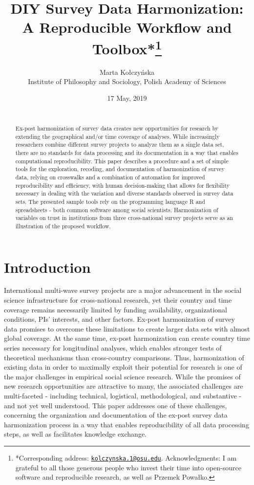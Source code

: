 \documentclass[12pt,]{article}
\title{\vspace{1cm}DIY Survey Data Harmonization: A Reproducible Workflow and Toolbox*\footnote{*Corresponding address: \href{mailto:kolczynska.1@osu.edu}{\nolinkurl{kolczynska.1@osu.edu}}. Acknowledgments: I am grateful to all those generous people who invest their time into open-source software and reproducible research, as well as Przemek Powałko.}\vspace{0.5cm}\\}
\author{Marta Kołczyńska\\
Institute of Philosophy and Sociology, Polish Academy of Sciences}
\date{17 May, 2019\\
~\\}
\begin{document}
\maketitle
\begin{abstract}
\noindent{}Ex-post harmonization of survey data creates new opportunities for research by extending the geographical and/or time coverage of analyses. While increasingly researchers combine different survey projects to analyze them as a single data set, there are no standards for data processing and its documentation in a way that enables computational reproducibility. This paper describes a procedure and a set of simple tools for the exploration, recoding, and documentation of harmonization of survey data, relying on crosswalks and a combination of automation for improved reproducibility and efficiency, with human decision-making that allows for flexibility necessary in dealing with the variation and diverse standards observed in survey data sets. The presented sample tools rely on the programming language R and spreadsheets - both common software among social scientists. Harmonization of variables on trust in institutions from three cross-national survey projects serve as an illustration of the proposed workflow.\vspace{.8cm}
\end{abstract}

\clearpage

\renewcommand{\baselinestretch}{0.5}\normalsize
\tableofcontents
\renewcommand{\baselinestretch}{1.5}\normalsize

\clearpage

\parindent 0.5in

\hypertarget{introduction}{%
\section{Introduction}\label{introduction}}

International multi-wave survey projects are a major advancement in the social science infrastructure for cross-national research, yet their country and time coverage remains necessarily limited by funding availability, organizational conditions, PIs' interests, and other factors. Ex-post harmonization of survey data promises to overcome these limitations to create larger data sets with almost global coverage. At the same time, ex-post harmonization can create country time series necessary for longitudinal analyses, which enables stronger tests of theoretical mechanisms than cross-country comparisons. Thus, harmonization of existing data in order to maximally exploit their potential for research is one of the major challenges in empirical social science research. While the promises of new research opportunities are attractive to many, the associated challenges are multi-faceted - including technical, logistical, methodological, and substantive - and not yet well understood. This paper addresses one of these challenges, concerning the organization and documentation of the ex-post survey data harmonization process in a way that enables reproducibility of all data processing steps, as well as facilitates knowledge exchange.
\end{document}
